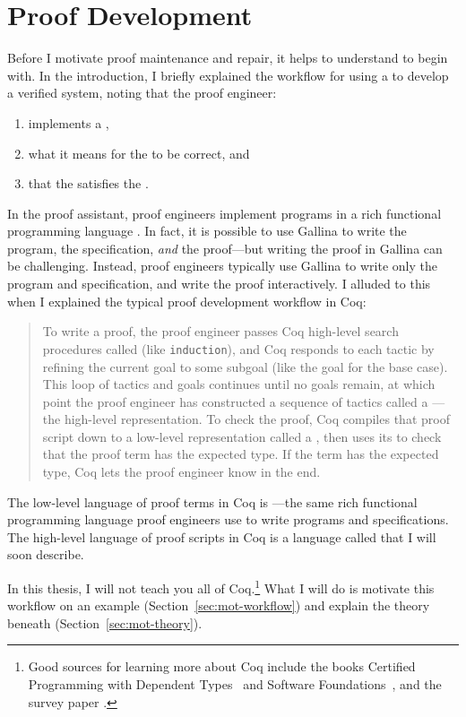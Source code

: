 \section{Proof Development}
\label{sec:mot-dev}

Before I motivate proof maintenance and repair, it helps to understand  to begin with.
In the introduction, I briefly explained the workflow for using a  to develop a verified system,
noting that the proof engineer:

\begin{enumerate}
\item implements a ,
\item {} what it means for the  to be correct, and
\item {} that the  satisfies the .
\end{enumerate}
In the  proof assistant, proof engineers implement programs in a rich functional programming language .
In fact, it is possible to use Gallina to write the program, the specification, \textit{and} the proof---but writing the proof in Gallina can be challenging.
Instead, proof engineers typically use Gallina to write only the program and specification,
and write the proof interactively.
I alluded to this when I explained the typical proof development workflow in Coq:

\begin{quote}
To write a proof, the proof engineer passes Coq high-level search procedures called  (like \lstinline{induction}), and Coq responds to each tactic
by refining the current goal to some subgoal (like the goal for the base case). This loop of tactics and goals 
continues until no goals remain, at which point the proof engineer has constructed a sequence of tactics called a ---the
high-level representation.
To check the proof, Coq compiles that proof script down to a low-level representation called a ,
then uses its  to check that the proof term has the expected type.
If the term has the expected type, Coq lets the proof engineer know in the end.
\end{quote}
The low-level language of proof terms in Coq is ---the same rich functional programming language proof engineers use to write programs and specifications.
The high-level language of proof scripts in Coq is a language called  that I will soon describe.

In this thesis, I will not teach you all of Coq.\footnote{Good sources 
for learning more about Coq include the books Certified Programming with Dependent Types~\cite{chlipala:cpdt}
and Software Foundations~\cite{software-foundations}, and the survey paper .}
What I will do is motivate this workflow on an example (Section~\ref{sec:mot-workflow})
and explain the theory beneath (Section~\ref{sec:mot-theory}).





